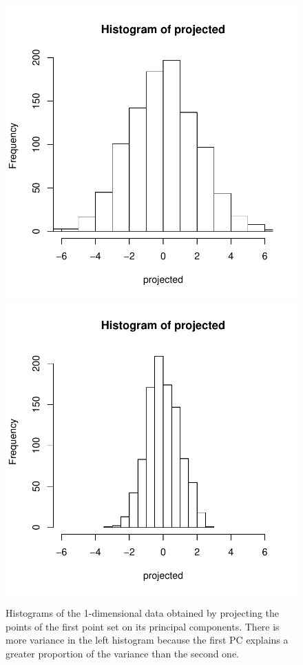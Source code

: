 \documentclass{article}
\begin{document}
\begin{figure} \centering
	\includegraphics[scale=\sscale]{histo1-1}
	\includegraphics[scale=\sscale]{histo1-2}
	\caption{Histograms of the 1-dimensional data obtained by projecting the points of the first point set on its principal components. There is more variance in the left histogram because the first PC explains a greater proportion of the variance than the second one.} \label{fig:histo}
\end{figure}
\end{document}
